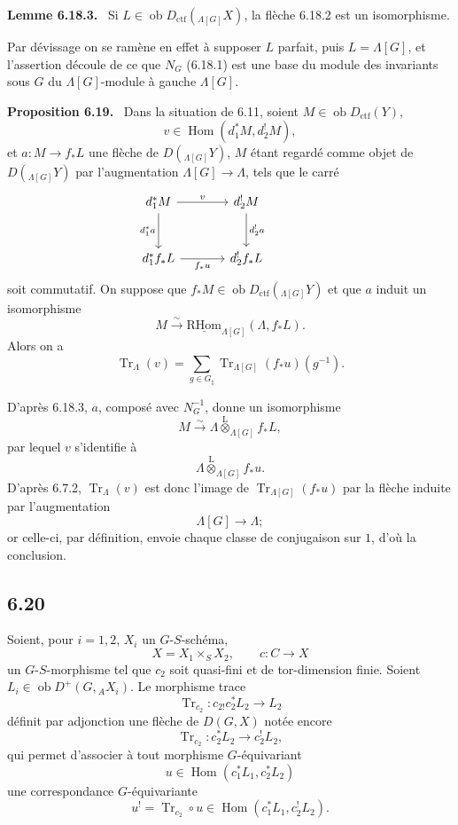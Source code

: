 \documentclass[11pt]{article}
\newenvironment{statement}[1]{\par\medskip\noindent\textbf{#1.}\ }{\par\medskip}
\DeclareMathOperator{\Hom}{Hom}
\newcommand{\R}{\mathrm{R}}\newcommand{\RHomCore}{\mathrm{RHom}}
\providecommand{\RHom}{\RHomCore}
\providecommand{\uRHom}{\underline{\RHom}}
\providecommand{\Tr}{\operatorname{Tr}}
\providecommand{\Tr}{\operatorname{Tr}}
\providecommand{\lten}{\overset{\mathrm L}{\otimes}}
\providecommand{\Ob}{\operatorname{ob}}
\providecommand{\Tr}{\operatorname{Tr}}
\providecommand{\RHom}{\RHomCore}
\providecommand{\Hom}{\operatorname{Hom}}
\providecommand{\lten}{\overset{\mathrm L}{\otimes}}
\providecommand{\RHom}{\R\mathcal{H}om}
\providecommand{\lten}{\overset{\mathrm L}{\otimes}}
\providecommand{\Ob}{\operatorname{ob}}
\providecommand{\R}{\mathrm R}
\providecommand{\Tr}{\operatorname{Tr}}
\providecommand{\lten}{\overset{\mathrm L}{\otimes}}
\providecommand{\lten}{\overset{\mathrm L}{\otimes}}
\providecommand{\Ob}{\operatorname{Ob}}
\providecommand{\lten}{\overset{\mathrm L}{\otimes}}
\providecommand{\RHom}{\RHomCore}
\providecommand{\Hom}{\operatorname{Hom}}
\providecommand{\Tr}{\operatorname{Tr}}
\providecommand{\Ob}{\operatorname{ob}}
\providecommand{\Ob}{\operatorname{Ob}}
\providecommand{\lten}{\overset{\mathrm L}{\otimes}}
\begin{document}
\begin{statement}{Lemme 6.18.3}
Si $L\in\Ob D_{\mathrm{ctf}}({}_{\Lambda[G]}X)$, la flèche 6.18.2 est un isomorphisme.
\end{statement}

Par dévissage on se ramène en effet à supposer $L$ parfait, puis $L=\Lambda[G]$, et l'assertion découle de ce que $N_G$ (6.18.1) est une base du module des invariants sous $G$ du $\Lambda[G]$-module à gauche $\Lambda[G]$.

\begin{statement}{Proposition 6.19}
Dans la situation de 6.11, soient $M\in\Ob D_{\mathrm{ctf}}(Y)$,
\[
v\in\Hom(d_1^*M,d_2^!M),
\]
et $a:M\to f_*L$ une flèche de $D({}_{\Lambda[G]}Y)$, $M$ étant regardé comme objet de $D({}_{\Lambda[G]}Y)$ par l'augmentation $\Lambda[G]\to\Lambda$, tels que le carré
\[
\begin{tikzcd}[column sep=large,row sep=large]
d_1^*M \arrow[r,"v"] \arrow[d,"d_1^*a"'] & d_2^!M \arrow[d,"d_2^!a"] & {}\\
d_1^*f_*L \arrow[r,"f_*u"'] & d_2^!f_*L
\end{tikzcd}
\]
soit commutatif. On suppose que $f_*M\in\Ob D_{\mathrm{ctf}}({}_{\Lambda[G]}Y)$ et que $a$ induit un isomorphisme
\[
M\xrightarrow{\sim}\uRHom_{\Lambda[G]}(\Lambda,f_*L).
\]
Alors on a
\begin{equation}
\Tr_{\Lambda}(v)=
\sum_{g\in G_{\natural}}\Tr_{\Lambda[G]}(f_*u)(g^{-1}).
\tag{6.19.1}
\end{equation}
\end{statement}

D'après 6.18.3, $a$, composé avec $N_G^{-1}$, donne un isomorphisme
\[
M\xrightarrow{\sim}\Lambda\lten_{\Lambda[G]}f_*L,
\]
par lequel $v$ s'identifie à
\[
\Lambda\lten_{\Lambda[G]}f_*u.
\]
D'après 6.7.2, $\Tr_{\Lambda}(v)$ est donc l'image de $\Tr_{\Lambda[G]}(f_*u)$ par la flèche induite par l'augmentation
\[
\Lambda[G]\longrightarrow \Lambda;
\]
or celle-ci, par définition, envoie chaque classe de conjugaison sur $1$, d'où la conclusion.

\subsection*{6.20}
Soient, pour $i=1,2$, $X_i$ un $G$-$S$-schéma,
\[
X=X_1\times_SX_2,\qquad c:C\to X
\]
un $G$-$S$-morphisme tel que $c_2$ soit quasi-fini et de tor-dimension finie. Soient $L_i\in\Ob D^+(G,{}_AX_i)$. Le morphisme trace
\[
\Tr_{c_2}:c_{2!}c_2^*L_2\longrightarrow L_2
\]
définit par adjonction une flèche de $D(G,X)$ notée encore
\begin{equation}
\Tr_{c_2}:c_2^*L_2\longrightarrow c_2^!L_2,
\tag{6.20.1}
\end{equation}
qui permet d'associer à tout morphisme $G$-équivariant
\[
u\in\Hom(c_1^*L_1,c_2^*L_2)
\]
une correspondance $G$-équivariante
\begin{equation}
u^! = \Tr_{c_2}\circ u\in\Hom(c_1^*L_1,c_2^!L_2).
\tag{6.20.2}
\end{equation}
\end{document}
